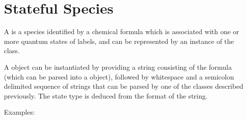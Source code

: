\documentclass[letterpaper,10pt,english]{sphinxmanual}
\begin{document}
\begin{sphinxVerbatim}[commandchars=\\\{\}]
 \PYG{p}{[}\PYG{p}{]}    
 \PYG{p}{[}\PYG{p}{]}   
 \PYG{p}{[}\PYG{p}{]}   
\end{sphinxVerbatim}


\chapter{Stateful Species}
\label{\detokenize{stateful_species:stateful-species}}\label{\detokenize{stateful_species::doc}}
A  is a species identified by a chemical formula which is associated with one or more quantum states of labels, and can be represented by an instance of the  class.

A  object can be instantiated by providing a string consisting of the formula (which can be parsed into a  object), followed by whitespace and a semicolon delimited sequence of strings that can be parsed by one of the  classes described previously. The state type is deduced from the format of the string.

Examples:

\begin{sphinxVerbatim}[commandchars=\\\{\}]
 \PYG{p}{[}\PYG{p}{]}    
 \PYG{p}{[}\PYG{p}{]}   
 \PYG{p}{[}\PYG{p}{]}   
 \PYG{p}{[}\PYG{p}{]}   
 \PYG{p}{[}\PYG{p}{]}   
\end{sphinxVerbatim}
\end{document}
